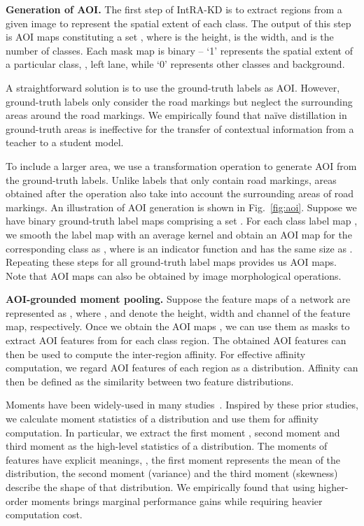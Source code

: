 \documentclass[10pt,twocolumn,letterpaper]{article}
\begin{document}
\noindent \textbf{Generation of AOI.} The first step of IntRA-KD is to extract regions from a given image to represent the spatial extent of each class. The output of this step is  AOI maps constituting a set , where  is the height,  is the width, and  is the number of classes.
Each mask map is binary -- `1' represents the spatial extent of a particular class, \eg, left lane, while `0' represents other classes and background.


A straightforward solution is to use the ground-truth labels as AOI. However, ground-truth labels only consider the road markings but neglect the surrounding areas around the road markings. 
We empirically found that na\"{i}ve distillation in ground-truth areas is ineffective for the transfer of contextual information from a teacher to a student model. 

To include a larger area, we use a transformation operation to generate AOI from the ground-truth labels. Unlike labels that only contain road markings, areas obtained after the operation also take into account the surrounding areas of road markings.
An illustration of AOI generation is shown in Fig.~\ref{fig:aoi}.
Suppose we have  binary ground-truth label maps comprising a set . 
For each class label map , we smooth the label map with an average kernel  and obtain an AOI map for the corresponding class as , where  is an indicator function and  has the same size as . 
Repeating these steps for all  ground-truth label maps provides us  AOI maps.
Note that AOI maps can also be obtained by image morphological operations.






\vspace{0.1cm}
\noindent \textbf{AOI-grounded moment pooling.} 
Suppose the feature maps of a network are represented as , where ,  and  denote the height, width and channel of the feature map, respectively. 
Once we obtain the AOI maps , we can use them as masks to extract AOI features from  for each class region. 
The obtained AOI features can then be used to compute the inter-region affinity.
For effective affinity computation, we regard AOI features of each region as a distribution. Affinity can then be defined as the similarity between two feature distributions. 


Moments have been widely-used in many studies~\cite{Peng_2019_ICCV,zellinger2017central}. 
Inspired by these prior studies, we calculate moment statistics of a distribution and use them for affinity computation. In particular, we extract the first moment , second moment  and third moment  as the high-level statistics of a distribution. 
The moments of features have explicit meanings, \ie, the first moment represents the mean of the distribution, the second moment (variance) and the third moment (skewness) describe the shape of that distribution.
We empirically found that using higher-order moments brings marginal performance gains while requiring heavier computation cost.
\end{document}
